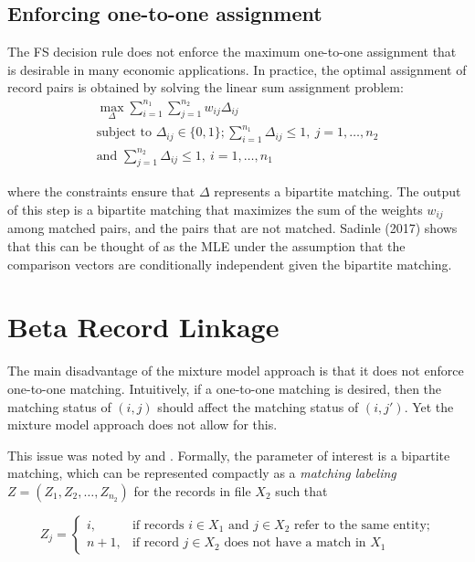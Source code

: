 \documentclass[11pt,reqno]{amsart}
\begin{document}
\subsection{Enforcing one-to-one assignment}

The FS decision rule does not enforce the maximum one-to-one assignment that is desirable in many economic applications.  In practice, the optimal assignment of record pairs is obtained by solving the linear sum assignment problem: 
\begin{gather*}
\max_{\Delta} \sum_{i=1}^{n_1}\sum_{j=1}^{n_2} w_{ij} \Delta_{ij}\\
\text{subject to } \Delta_{ij} \in \{0,1\}; \sum_{i=1}^{n_1} \Delta_{ij} \leq 1, \ j=1, \dots, n_2 \\ \text{and } \sum_{j=1}^{n_2} \Delta_{ij} \leq 1, \ i=1, \dots, n_1 
\end{gather*} 

where the constraints ensure that $\Delta$ represents a bipartite matching.  The output of this step is a bipartite matching that maximizes the sum of the weights $w_{ij}$ among matched pairs, and the pairs that are not matched.  Sadinle (2017) shows that this can be thought of as the MLE under the assumption that the comparison vectors are conditionally independent given the bipartite matching. %

\section{Beta Record Linkage \citep{sadinle_2017}}

The main disadvantage of the mixture model approach is that it does not enforce one-to-one matching.  Intuitively, if a one-to-one matching is desired, then the matching status of $(i,j)$ should affect the matching status of $(i,j')$.  Yet the mixture model approach does not allow for this.  

This issue was noted by \cite{larsen_2005} and \cite{sadinle_2017}.  Formally, the parameter of interest is a bipartite matching, which can be represented compactly as a \textit{matching labeling} $Z= (Z_1, Z_2,\dots, Z_{n_2})$ for the records in file $X_2$ such that

\[ Z_j = \begin{cases} i, & \text{if records $i\in X_1$ and $j\in X_2$ refer to the same entity;} \\
				n+1, & \text{if record $j\in X_2$ does not have a match in $X_1$} \end{cases} \]
\end{document}
